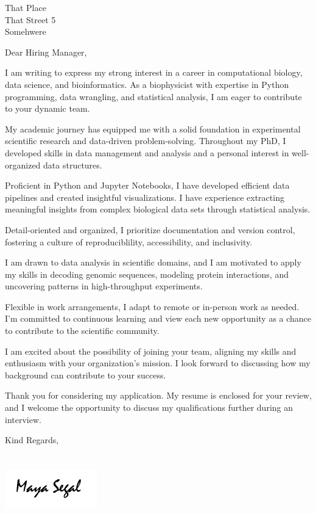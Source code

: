 \documentclass[roboto,noadress,custcol]{friggeri-txt}                       %
\begin{document}

\begin{letter}{                                                  %
That Place \\                                                    %
That Street 5 \\
Somehwere}

\opening{Dear Hiring Manager,}

I am writing to express my strong interest in a career in computational biology, data science, and bioinformatics. 
As a biophysicist with expertise in Python programming, data wrangling, and statistical analysis, I am eager to contribute to your dynamic team.

My academic journey has equipped me with a solid foundation in experimental scientific research and data-driven problem-solving. 
Throughout my PhD, I developed skills in data management and analysis and a personal interest in well-organized data structures.

Proficient in Python and Jupyter Notebooks, I have developed efficient data pipelines and created insightful visualizations. 
I have experience extracting meaningful insights from complex biological data sets through statistical analysis.

Detail-oriented and organized, I prioritize documentation and version control, fostering a culture of reproduciblility, accessibility, and inclusivity.

I am drawn to data analysis in scientific domains, and I am motivated to apply my skills in decoding genomic sequences, modeling protein interactions, and uncovering patterns in high-throughput experiments.

Flexible in work arrangements, I adapt to remote or in-person work as needed. 
I'm committed to continuous learning and view each new opportunity as a chance to contribute to the scientific community.

I am excited about the possibility of joining your team, aligning my skills and enthusiasm with your organization's mission. 
I look forward to discussing how my background can contribute to your success.

Thank you for considering my application. 
My resume is enclosed for your review, and I welcome the opportunity to discuss my qualifications further during an interview.

Kind Regards,\\
\\
\\
\includegraphics[width=40mm]{signature.png}                                                %
\vspace*{-40pt}
\end{letter}
\end{document}
